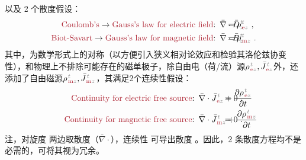 以及 2 个散度假设：
\begin{subequations} \label{eq:maxwell-db}
\begin{align}
	\textcolor{Maroon}{\text{Coulomb's}} \to \textcolor{Maroon}{\text{Gauss's law for electric field}}\text{:}&\hspace{0.5em} \bar{\nabla} \cdot \bar{D}^{\;\!\textcolor{gray}{t}}_{\;\!\textcolor{gray}{z}} \hspace{-3.2em} &&= {\rho}^{\;\!\textcolor{gray}{t}}_{\;\!\textcolor{Maroon}{\text{e}}\textcolor{gray}{z}}~, \label{eq:maxwell-d} \\ \textcolor{Maroon}{\text{Biot-Savart}} \to \textcolor{Maroon}{\text{Gauss's law for magnetic field}}\text{:}&\hspace{0.5em} \bar{\nabla} \cdot \bar{B}^{\;\!\textcolor{gray}{t}}_{\;\!\textcolor{gray}{z}} \hspace{-3.2em} &&= {\rho}^{\;\!\textcolor{gray}{t}}_{\;\!\textcolor{Maroon}{\text{m}}\textcolor{gray}{z}}~. \label{eq:maxwell-b}
\end{align}
\end{subequations}
其中，为数学形式上的对称（以方便引入狭义相对论效应和检验其洛伦兹协变性\cite{lakhtakiaCovariancesInvariancesMaxwell1995,chen-zhuChenZhuxieUndergraduate_courses2024}），和物理上不排除可能存在的磁单极子，除自由电（荷/流）源${\rho}^{\;\!\textcolor{gray}{t}}_{\;\!\textcolor{Maroon}{\text{e}}\textcolor{gray}{z}}, \bar{J}^{\;\!\textcolor{gray}{t}}_{\;\!\textcolor{Maroon}{\text{e}}\textcolor{gray}{z}}$外，还添加了自由磁源${\rho}^{\;\!\textcolor{gray}{t}}_{\;\!\textcolor{Maroon}{\text{m}}\textcolor{gray}{z}}, \bar{J}^{\;\!\textcolor{gray}{t}}_{\;\!\textcolor{Maroon}{\text{m}}\textcolor{gray}{z}}$\cite{lakhtakiaCovariancesInvariancesMaxwell1995}，其满足2个连续性假设\cite{mackayElectromagneticAnisotropyBianisotropy2019,lakhtakiaCovariancesInvariancesMaxwell1995,chen-zhuChenZhuxieUndergraduate_courses2024}：
\begin{subequations} \label{eq:continuity-pj}
\begin{align}
	\textcolor{Maroon}{\text{Continuity for electric free source}}\text{:}&\hspace{0.5em} \bar{\nabla} \cdot \bar{J}^{\;\!\textcolor{gray}{t}}_{\;\!\textcolor{Maroon}{\text{e}}\textcolor{gray}{z}} + \frac{\partial {\rho}^{\;\!\textcolor{gray}{t}}_{\;\!\textcolor{Maroon}{\text{e}}\textcolor{gray}{z}}}{\partial t} \hspace{-5.2em} &&= 0~, \label{eq:continuity-e} \\ \textcolor{Maroon}{\text{Continuity for magnetic free source}}\text{:}&\hspace{0.5em} \bar{\nabla} \cdot \bar{J}^{\;\!\textcolor{gray}{t}}_{\;\!\textcolor{Maroon}{\text{m}}\textcolor{gray}{z}} + \frac{\partial {\rho}^{\;\!\textcolor{gray}{t}}_{\;\!\textcolor{Maroon}{\text{m}}\textcolor{gray}{z}}}{\partial t} \hspace{-5.2em} &&= 0~. \label{eq:continuity-m}
\end{align}
\end{subequations}
注，对旋度  两边取散度（$\bar{\nabla} \cdot$），连续性  可导出散度 。因此，2 条散度方程均不是必需的，可将其视为冗余。

